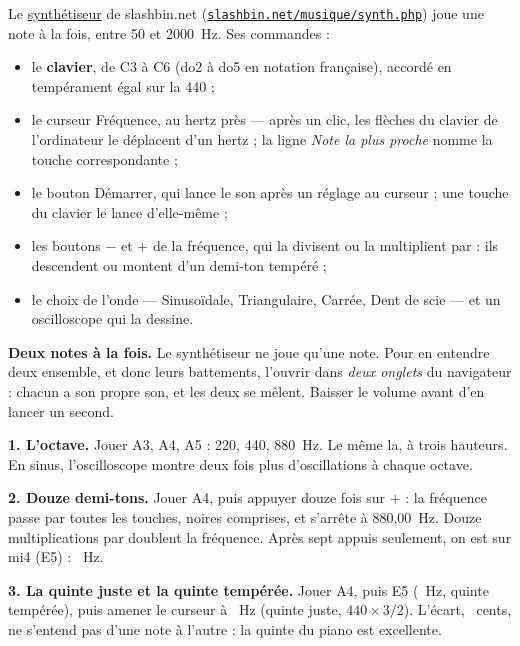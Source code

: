 \documentclass[a4paper,11pt]{article}
\newcommand{\synthurl}{https://www.slashbin.net/musique/synth.php}
\newcommand{\synth}{\href{\synthurl}{synthétiseur}}
\newcommand{\touche}[1]{\textsf{\small #1}}   %
\begin{document}
Le \synth{} de slashbin.net
(\href{\synthurl}{\texttt{slashbin.net/musique/synth.php}}) joue une note à la
fois, entre 50 et 2000~Hz. Ses commandes :

\begin{itemize}
  \item le \textbf{clavier}, de \touche{C3} à \touche{C6} (do2 à do5 en
    notation française), accordé en tempérament égal sur la 440 ;
  \item le curseur \touche{Fréquence}, au hertz près --- après un clic, les
    flèches du clavier de l'ordinateur le déplacent d'un hertz ; la ligne
    \emph{Note la plus proche} nomme la touche correspondante ;
  \item le bouton \touche{Démarrer}, qui lance le son après un réglage au
    curseur ; une touche du clavier le lance d'elle-même ;
  \item les boutons \touche{$-$} et \touche{$+$} de la fréquence, qui la
    divisent ou la multiplient par \demiTon : ils descendent ou montent d'un
    demi-ton tempéré ;
  \item le choix de l'onde --- \touche{Sinusoïdale}, \touche{Triangulaire},
    \touche{Carrée}, \touche{Dent de scie} --- et un oscilloscope qui la
    dessine.
\end{itemize}

\begin{remarque}
\textbf{Deux notes à la fois.} Le synthétiseur ne joue qu'une note. Pour en
entendre deux ensemble, et donc leurs battements, l'ouvrir dans
\emph{deux onglets} du navigateur : chacun a son propre son, et les deux se
mêlent. Baisser le volume avant d'en lancer un second.
\end{remarque}

\begin{ecoute}
\textbf{1. L'octave.} Jouer \touche{A3}, \touche{A4}, \touche{A5} : 220, 440,
880~Hz. Le même la, à trois hauteurs. En sinus, l'oscilloscope montre deux
fois plus d'oscillations à chaque octave.
\end{ecoute}

\begin{ecoute}
\textbf{2. Douze demi-tons.} Jouer \touche{A4}, puis appuyer douze fois sur
\touche{$+$} : la fréquence passe par toutes les touches, noires comprises, et
s'arrête à 880,00~Hz. Douze multiplications par \demiTon{} doublent la
fréquence. Après sept appuis seulement, on est sur mi4 (\touche{E5}) : \miSynth~Hz.
\end{ecoute}

\begin{ecoute}
\textbf{3. La quinte juste et la quinte tempérée.} Jouer \touche{A4}, puis
\touche{E5} (\miSynth~Hz, quinte tempérée), puis amener le curseur à
\miJuste~Hz (quinte juste, $440 \times 3/2$). L'écart, \ecartQuinte~cents, ne
s'entend pas d'une note à l'autre : la quinte du piano est excellente.
\end{ecoute}
\end{document}
